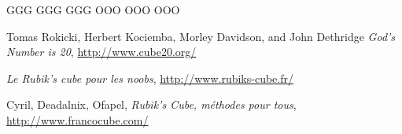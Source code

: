 \documentclass[10pt,paper=a5,pagesize]{scrbook}
\begin{document}
{
	\centering
	\RubikFaceRight%
	{G}{G}{G}%
	{G}{G}{G}%
	{G}{G}{G}
	\RubikFaceFront%
	{O}{O}{O}%
	{O}{O}{O}%
	{O}{O}{O}
	\par
}

\begin{thebibliography}{9}
	
	 Tomas Rokicki, Herbert Kociemba, Morley Davidson, and John Dethridge
	\emph{God's Number is 20},
	\url{http://www.cube20.org/}

	\emph{Le Rubik's cube pour les noobs},
	\url{http://www.rubiks-cube.fr/}

	Cyril, Deadalnix, Ofapel,
	\emph{Rubik's Cube, méthodes pour tous},
	\url{http://www.francocube.com/}
	
\end{thebibliography}
\end{document}
